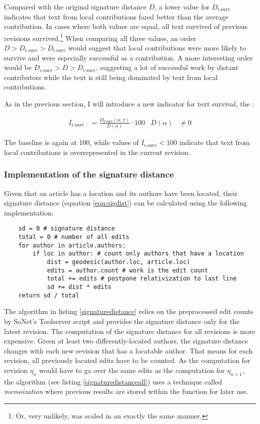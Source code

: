 Compared with the original signature distance $D$, a lower value for $D_{\text{t.surv}}$ indicates that text from local contributions fared better than the average contribution.
In cases where both values are equal, all text survived of previous revisions survived.\footnote{Or, very unlikely, was scaled in an exactly the same manner.}
When comparing all three values, an order $D > D_{\text{e.surv}} > D_{\text{t.surv}}$ would suggest that local contributions were more likely to survive and were especially successful as a contribution.
A more interesting order would be $D_{\text{e.surv}} > D > D_{\text{t.surv}}$, suggesting a lot of successful work by distant contributors while the text is still being dominated by text from local contributions.

As in the previous section, I will introduce a new indicator for text survival, the :

\begin{align}
 I_{\text{t.surv}} &= \frac{D_{\text{t.surv}}(\alpha,\pi)}{D(\alpha)} \cdot 100 & D(\alpha) &\neq 0
\end{align}

The baseline is again at 100, while values of $I_{\text{e.surv}} < 100$ indicate that text from local contributions is overrepresented in the current revision.

\subsubsection{Implementation of the signature distance}\label{sub:sigdistimpl}

Given that an article has a location and its authors have been located, their signature distance (equation \ref{eqn:sigdist}) can be calculated using the following implementation:

\begin{lstlisting}
	sd = 0 # signature distance
	total = 0 # number of all edits
	for author in article.authors:
		if loc in author: # count only authors that have a location
			dist = geodesic(author.loc, article.loc)
			edits = author.count # work is the edit count
			total += edits # postpone relativization to last line 
			sd += dist * edits
	return sd / total
\end{lstlisting}

The algorithm in listing \ref{signaturedistance} relies on the preprocessed edit counts by SoNet's Toolserver script and provides the signature distance only for the latest revision. 
The computation of the signature distance for all revisions is more expensive.
Given at least two differently-located authors, the signature distance changes with each new revision that has a locatable author.
That means for each revision, all previously located edits have to be counted.
As the computation for revision $\eta_{n}$ would have to go over the same edits as the computation for $\eta_{n+1}$, the algorithm (see listing \ref{signaturedistanceall}) uses a technique called \emph{memoization} where previous results are stored within the function for later use.


